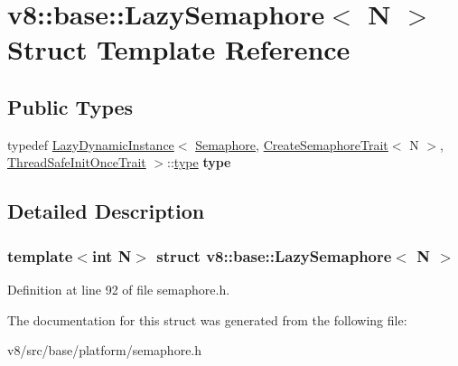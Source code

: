 \hypertarget{structv8_1_1base_1_1LazySemaphore}{}\section{v8\+:\+:base\+:\+:Lazy\+Semaphore$<$ N $>$ Struct Template Reference}
\label{structv8_1_1base_1_1LazySemaphore}
\subsection*{Public Types}
\begin{DoxyCompactItemize}
\item 
\mbox{\label{structv8_1_1base_1_1LazySemaphore_a18fcc8e9b93da4e0d3efc225a74f9668}} 
typedef \mbox{\hyperlink{structv8_1_1base_1_1LazyDynamicInstance}{Lazy\+Dynamic\+Instance}}$<$ \mbox{\hyperlink{classv8_1_1base_1_1Semaphore}{Semaphore}}, \mbox{\hyperlink{structv8_1_1base_1_1CreateSemaphoreTrait}{Create\+Semaphore\+Trait}}$<$ N $>$, \mbox{\hyperlink{structv8_1_1base_1_1ThreadSafeInitOnceTrait}{Thread\+Safe\+Init\+Once\+Trait}} $>$\+::\mbox{\hyperlink{structv8_1_1base_1_1LazyInstanceImpl}{type}} {\bfseries type}
\end{DoxyCompactItemize}


\subsection{Detailed Description}
\subsubsection*{template$<$int N$>$\newline
struct v8\+::base\+::\+Lazy\+Semaphore$<$ N $>$}



Definition at line 92 of file semaphore.\+h.



The documentation for this struct was generated from the following file\+:\begin{DoxyCompactItemize}
\item 
v8/src/base/platform/semaphore.\+h\end{DoxyCompactItemize}
